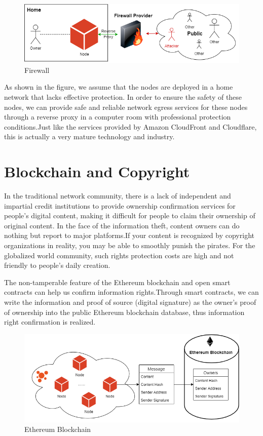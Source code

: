 \documentclass{article}
\begin{document}
    \begin{figure}[H]
        \centering
        \includegraphics[width=\textwidth]{figures-firewall.png}
        \caption{Firewall}
    \end{figure}

    As shown in the figure, we assume that the nodes are deployed in a home network that lacks effective protection. In order to ensure the safety of these nodes, we can provide safe and reliable network egress services for these nodes through a reverse proxy in a computer room with professional protection conditions.Just like the services provided by Amazon CloudFront and Cloudflare, this is actually a very mature technology and industry.
\section{Blockchain and Copyright}
    In the traditional network community, there is a lack of independent and impartial credit institutions to provide ownership confirmation services for people's digital content, making it difficult for people to claim their ownership of original content. In the face of the information theft, content owners can do nothing but report to major platforms.If your content is recognized by copyright organizations in reality, you may be able to smoothly punish the pirates. For the globalized world community, such rights protection costs are high and not friendly to people's daily creation.

    The non-tamperable feature of the Ethereum blockchain and open smart contracts can help us confirm information rights.Through smart contracts, we can write the information and proof of source (digital signature) as the owner's proof of ownership into the public Ethereum blockchain database, thus information right confirmation is realized.


    \begin{figure}[H]
        \centering
        \includegraphics[width=\textwidth]{figures-blockchain.png}
        \caption{Ethereum Blockchain}
    \end{figure}
    
\end{document}
